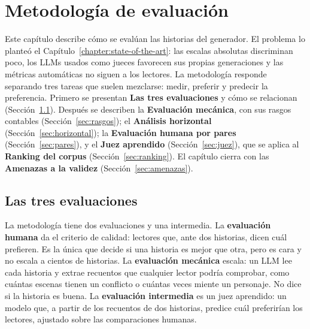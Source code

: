 \chapter{Metodología de evaluación}\label{chapter:evaluation}

Este capítulo describe cómo se evalúan las historias del generador. El problema lo planteó el
Capítulo~\ref{chapter:state-of-the-art}: las escalas absolutas discriminan poco, los LLMs usados como
jueces favorecen sus propias generaciones y las métricas automáticas no siguen a los lectores. La
metodología responde separando tres tareas que suelen mezclarse: medir, preferir y predecir la
preferencia. Primero se presentan \textbf{Las tres evaluaciones} y cómo se relacionan
(Sección~\ref{sec:tres-evaluaciones}). Después se describen la \textbf{Evaluación mecánica}, con sus
rasgos contables (Sección~\ref{sec:rasgos}); el \textbf{Análisis horizontal}
(Sección~\ref{sec:horizontal}); la \textbf{Evaluación humana por pares}
(Sección~\ref{sec:pares}), y el \textbf{Juez aprendido} (Sección~\ref{sec:juez}), que se aplica al
\textbf{Ranking del corpus} (Sección~\ref{sec:ranking}). El capítulo cierra con las \textbf{Amenazas
a la validez} (Sección~\ref{sec:amenazas}).

\section{Las tres evaluaciones}\label{sec:tres-evaluaciones}

La metodología tiene dos evaluaciones y una intermedia. La \textbf{evaluación humana} da el criterio
de calidad: lectores que, ante dos historias, dicen cuál prefieren. Es la única que decide si una
historia es mejor que otra, pero es cara y no escala a cientos de historias. La \textbf{evaluación
mecánica} escala: un LLM lee cada historia y extrae recuentos que cualquier lector podría
comprobar, como cuántas escenas tienen un conflicto o cuántas veces miente un personaje. No dice si
la historia es buena. La \textbf{evaluación intermedia} es un juez aprendido: un modelo que, a partir
de los recuentos de dos historias, predice cuál preferirían los lectores, ajustado sobre las
comparaciones humanas.

